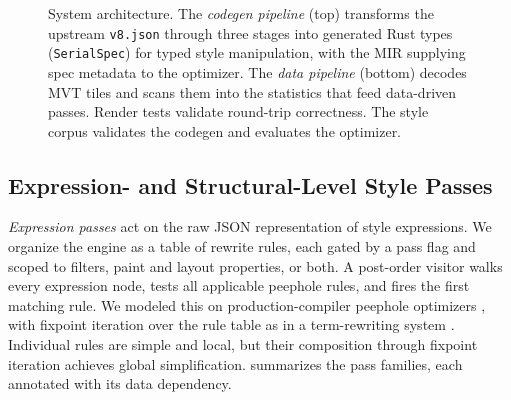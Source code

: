 \begin{figure}[htbp]
{}
    \caption{
System architecture.
    The \emph{codegen pipeline} (top) transforms the upstream \texttt{v8.json} through three stages into generated Rust types (\texttt{SerialSpec}) for typed style manipulation, with the MIR supplying spec metadata to the optimizer.
    The \emph{data pipeline} (bottom) decodes \acs{MVT} tiles and scans them into the statistics that feed data-driven passes.
Render tests validate round-trip correctness.
The style corpus validates the codegen and evaluates the optimizer.}
    \label{fig:system_architecture}
\end{figure}

\subsection{Expression- and Structural-Level Style Passes}\label{sec:methods:style}

\textit{Expression passes} act on the raw JSON representation of style expressions.
We organize the engine as a table of rewrite rules, each gated by a pass flag and scoped to filters, paint and layout properties, or both.
A post-order visitor walks every expression node, tests all applicable peephole rules, and fires the first matching rule.
We modeled this on production-compiler peephole optimizers \citep{ahoCompilersPrinciplesTechniques2007}, with fixpoint iteration over the rule table as in a term-rewriting system \citep{baaderTermRewritingAll1999}.
Individual rules are simple and local, but their composition through fixpoint iteration achieves global simplification.
 summarizes the pass families, each annotated with its data dependency.

